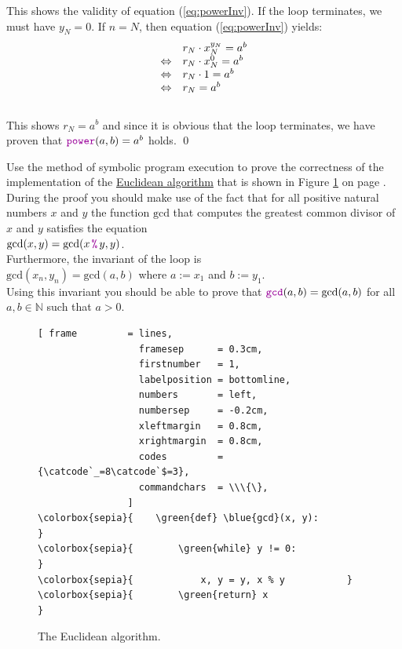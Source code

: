 This shows the validity of equation (\ref{eq:powerInv}).   If the  loop
terminates, we must have $y_N = 0$.  If $n=N$, then equation (\ref{eq:powerInv}) yields:
\\[0.2cm]
\hspace*{1.3cm}
$$
\begin{array}[t]{cl}
                 & r_N \cdot x_N^{y_N} = a^b \\
\Leftrightarrow  & r_N \cdot x_N^{0}  = a^b \\
\Leftrightarrow  & r_N \cdot 1       = a^b \\
\Leftrightarrow  & r_N               = a^b
\end{array}
$$
\\[0.2cm]
This shows $r_N = a^b$ and since it is obvious that the  loop terminates, we have proven that
$\mytt{power}(a,b) =a^b$ holds. \qed

\exercise
Use the method of symbolic program execution to prove the correctness of the implementation of the
\href{https://en.wikipedia.org/wiki/Euclidean_algorithm}{Euclidean algorithm} that is shown in Figure
\ref{fig:gcd.stlx} on page \pageref{fig:gcd.stlx}.  During the proof 
you should make use of the fact that for all positive natural numbers $x$ and $y$ the function $\mathrm{gcd}$
that computes the greatest common divisor of $x$ and $y$ satisfies the equation
\\[0.2cm]
\hspace*{1.3cm}
$\mathrm{gcd}(x, y) = \mathrm{gcd}(x \,\mytt{\%}\, y, y)$.
\\[0.2cm]
Furthermore, the invariant of the  loop is
\\[0.2cm]
\hspace*{1.3cm}
$\mathrm{gcd}(x_n, y_n) = \mathrm{gcd}(a, b)$ \quad where $a := x_1$ and $b := y_1$.
\\[0.2cm]
Using this invariant you should be able to prove that $\mytt{gcd}(a, b) = \mathrm{gcd}(a, b)$ for all
$a, b \in \mathbb{N}$ such that $a > 0$.
\eox

\begin{figure}[!ht]
\centering
\begin{Verbatim}[ frame         = lines, 
                  framesep      = 0.3cm, 
                  firstnumber   = 1,
                  labelposition = bottomline,
                  numbers       = left,
                  numbersep     = -0.2cm,
                  xleftmargin   = 0.8cm,
                  xrightmargin  = 0.8cm,
                  codes         = {\catcode`_=8\catcode`$=3},
                  commandchars  = \\\{\},
                ]
\colorbox{sepia}{    \green{def} \blue{gcd}(x, y):                    }
\colorbox{sepia}{        \green{while} y != 0:                 }
\colorbox{sepia}{            x, y = y, x % y           }
\colorbox{sepia}{        \green{return} x                      }
\end{Verbatim}
\vspace*{-0.3cm}
\caption{The Euclidean algorithm.}
\label{fig:gcd.stlx}
\end{figure}
\pagebreak

